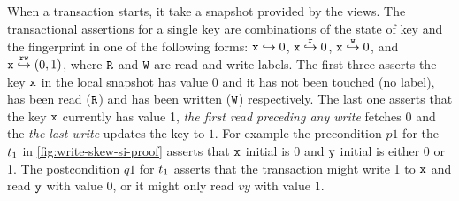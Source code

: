 When a transaction starts, it take a snapshot provided by the views.
The transactional assertions for a single key are combinations of the state of key and the fingerprint in one of the following forms: \( \texttt{x} \hookrightarrow 0 \), \( \texttt{x} \stackrel{\texttt{r}}{\hookrightarrow} 0\), \( \texttt{x} \stackrel{\texttt{w}}{\hookrightarrow} 0\), and \( \texttt{x} \stackrel{\texttt{rw}}{\hookrightarrow} (0,1) \), where \( \texttt{R} \) and \( \texttt{W} \) are read and write labels.
The first three asserts the key \( \texttt{x} \) in the local snapshot has value 0 and it has not been touched (no label), has been read (\(\texttt{R}\)) and has been written (\(\texttt{W}\)) respectively.
The last one asserts that the key \( \texttt{x} \) currently has value 1, \emph{the first read preceding any write} fetches 0 and the \emph{the last write} updates the key to \( 1 \).
For example the precondition \( p1 \) for the \( t_1 \) in \cref{fig:write-skew-si-proof} asserts that \( \texttt{x} \) initial is 0 and \( \texttt{y} \) initial is either 0 or 1.
The postcondition  \( q1 \) for \( t_1 \) asserts that the transaction might write 1 to \( \texttt{x} \) and read \( \texttt{y} \) with value 0, or it might only read \( vy \) with value 1.

